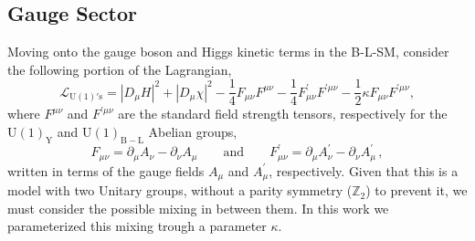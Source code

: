 \documentclass[10pt]{book}
\newcommand{\U}[1]{\mathrm{U}(1)_{\mathrm{#1}}}
\renewcommand{\(}{\left(}
\renewcommand{\)}{\right)}
\renewcommand{\[}{\left[}
\renewcommand{\]}{\right]}
\begin{document}
\subsection{Gauge Sector}

Moving onto the gauge boson and Higgs kinetic terms in the B-L-SM, consider the following portion of the Lagrangian,
\begin{equation}
\mathcal{L}_{\mathrm{U(1)'s}} =  \left| D_\mu H \right|^2 + \left| D_\mu \chi \right|^2 -\dfrac{1}{4} F_{\mu \nu} F^{\mu \nu} -\dfrac{1}{4} F^\prime_{\mu \nu} F^{\prime \mu \nu} -\dfrac{1}{2} \kappa F_{\mu \nu} F^{\prime \mu \nu} , 
\label{eq:Lu1}
\end{equation}
where $F^{\mu \nu}$ and $F^{\prime \mu \nu}$ are the standard field strength tensors, respectively for the $\U{Y}$ and  $\U{B-L}$ Abelian groups, 
\begin{equation}
	F_{\mu \nu} = \partial_\mu A_\nu - \partial_\nu A_\mu 
	\qquad
	\text{and}
	\qquad
	 F^\prime_{\mu \nu} = \partial_\mu A^\prime_\nu - \partial_\nu A^\prime_\mu\,,
	 \label{eq:Fmn}
\end{equation}
written in terms of the gauge fields $A_\mu$ and $A_\mu^\prime$, respectively. Given that this is a model with two Unitary groups, without a parity symmetry ($\mathbb{Z}_2$) to prevent it, we must consider the possible mixing in between them. In this work we parameterized this mixing trough a parameter $\kappa$.
\end{document}
